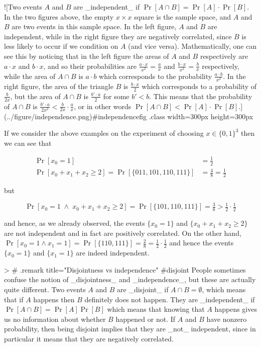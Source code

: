 ![Two events $A$ and $B$ are _independent_ if $\Pr[A \cap B]=\Pr[A]\cdot \Pr[B]$. In the two figures above, the empty $x\times x$ square is the sample space, and $A$ and $B$ are two events in this sample space. In the left figure, $A$ and $B$ are independent, while in the right figure they are negatively correlated, since $B$ is less likely to occur if we condition on $A$ (and vice versa). Mathematically, one can see this by noticing that in the left figure the areas of $A$ and $B$ respectively are $a\cdot x$ and $b\cdot x$, and so their probabilities are $\tfrac{a\cdot x}{x^2}=\tfrac{a}{x}$ and
$\tfrac{b\cdot x}{x^2}=\tfrac{b}{x}$ respectively, while the area of $A \cap B$ is $a\cdot b$ which corresponds to the probability $\tfrac{a\cdot b}{x^2}$. In the right figure, the area of the triangle $B$ is $\tfrac{b\cdot x}{2}$ which corresponds to a probability of  $\tfrac{b}{2x}$, but the area of $A \cap B$ is $\tfrac{b' \cdot a}{2}$ for some $b'<b$. This means that the probability of $A \cap B$ is $\tfrac{b'\cdot a}{2x^2} < \tfrac{b}{2x} \cdot \tfrac{a}{x}$, or in other words $\Pr[A \cap B ] < \Pr[A] \cdot \Pr[B]$.](../figure/independence.png){#independencefig .class width=300px height=300px}


If we consider the above examples on the experiment of choosing $x\in \{0,1\}^3$ then we can see that

$$
\begin{aligned}
\Pr[x_0=1] &= \tfrac{1}{2} \\
\Pr[x_0+x_1+x_2 \geq 2] = \Pr[\{ 011,101,110,111 \}] &= \tfrac{4}{8} = \tfrac{1}{2}
\end{aligned}
$$

but

$$
\Pr[x_0 =1 \; \wedge \; x_0+x_1+x_2 \geq 2 ] = \Pr[ \{101,110,111 \} ] = \tfrac{3}{8} > \tfrac{1}{2} \cdot \tfrac{1}{2}
$$

and hence, as we already observed, the events $\{ x_0 = 1 \}$ and $\{ x_0+x_1+x_2 \geq 2 \}$ are  not independent and in fact are positively correlated.
On the other hand, $\Pr[ x_0 = 1 \wedge x_1 = 1 ] = \Pr[ \{110,111 \}] = \tfrac{2}{8} = \tfrac{1}{2} \cdot \tfrac{1}{2}$ and hence the events $\{x_0 = 1 \}$ and $\{ x_1 = 1 \}$ are indeed independent.

> # {.remark title="Disjointness vs independence" #disjoint}
People sometimes confuse the notion of _disjointness_ and _independence_, but these are actually quite different.
Two events $A$ and $B$ are _disjoint_ if $A \cap B = \emptyset$, which means that if $A$ happens then $B$ definitely does not happen. They are _independent_ if $\Pr[A \cap B]=\Pr[A]\Pr[B]$ which means that knowing that $A$ happens gives us no information about whether $B$ happened or not. If $A$ and $B$ have nonzero probability, then being disjoint implies that they are _not_ independent, since in particular it means that they are negatively correlated.



